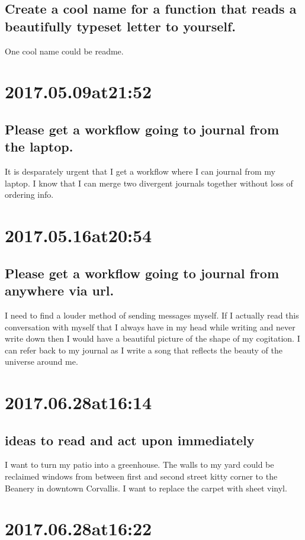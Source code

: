 \subsection*{ Create a cool name for a function that reads a beautifully typeset letter to yourself. }
One cool name could be readme.

\section*{ 2017.05.09at21:52 }
\subsection*{ Please get a workflow going to journal from the laptop. }
It is desparately urgent that I get a workflow where I can journal from my laptop. I know that I can merge two divergent journals together without loss of ordering info.

\section*{ 2017.05.16at20:54 }
\subsection*{ Please get a workflow going to journal from anywhere via url. }
I need to find a louder method of sending messages myself. If I actually read this conversation with myself that I always have in my head while writing and never write down then I would have a beautiful picture of the shape of my cogitation. I can refer back to my journal as I write a song that reflects the beauty of the universe around me.

\section*{ 2017.06.28at16:14 }
\subsection*{ ideas to read and act upon immediately }
I want to turn my patio into a greenhouse. The walls to my yard could be reclaimed windows from between first and second street kitty corner to the Beanery in downtown Corvallis. I want to replace the carpet with sheet vinyl.

\section*{ 2017.06.28at16:22 }
